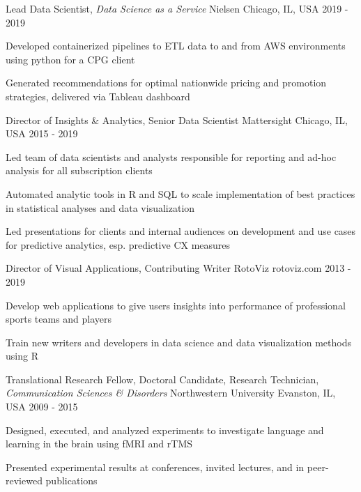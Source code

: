 \begin{cventries}
 \cventry
    {Lead Data Scientist, \textit{Data Science as a Service}} %
    {Nielsen} %
    {Chicago, IL, USA} %
    {2019 - 2019} %
    {
      \begin{cvitems}
        \item {Developed containerized pipelines to ETL data to and from AWS environments using python for a CPG client}
        \item {Generated recommendations for optimal nationwide pricing and promotion strategies, delivered via Tableau dashboard}
      \end{cvitems}
    }

 \cventry
    {Director of Insights \& Analytics, Senior Data Scientist} %
    {Mattersight} %
    {Chicago, IL, USA} %
    {2015 - 2019} %
    {
      \begin{cvitems}
        \item {Led team of data scientists and analysts responsible for reporting and ad-hoc analysis for all subscription clients}
        \item {Automated analytic tools in R and SQL to scale implementation of best practices in statistical analyses and data visualization}
        \item {Led presentations for clients and internal audiences on development and use cases for predictive analytics, esp. predictive CX measures}
      \end{cvitems}
    }
    
 \cventry
    {Director of Visual Applications, Contributing Writer}
    {RotoViz}
    {rotoviz.com}
    {2013 - 2019}
    {
     \begin{cvitems}
       \item {Develop web applications to give users insights into performance of professional sports teams and players}
       \item {Train new writers and developers in data science and data visualization methods using R}
     \end{cvitems}
   }
   
 \cventry
    {Translational Research Fellow, Doctoral Candidate, Research Technician, \textit{Communication Sciences \& Disorders}} %
    {Northwestern University} %
    {Evanston, IL, USA} %
    {2009 - 2015} %
   {
    \begin{cvitems}
    \item {Designed, executed, and analyzed experiments to investigate language and learning in the brain using fMRI and rTMS}
    \item {Presented experimental results at conferences, invited lectures, and in peer-reviewed publications} 
    \end{cvitems}
    }
    
\end{cventries}
